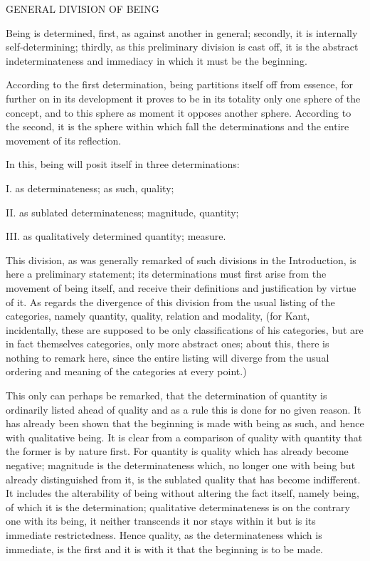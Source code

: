 GENERAL DIVISION OF BEING

Being is determined, first, as against another in general;
secondly, it is internally self-determining;
thirdly, as this preliminary division is cast off,
it is the abstract indeterminateness and immediacy
in which it must be the beginning.

According to the first determination,
being partitions itself off from essence,
for further on in its development it proves to be
in its totality only one sphere of the concept,
and to this sphere as moment it opposes another sphere.
According to the second, it is the sphere
within which fall the determinations
and the entire movement of its reflection.

In this, being will posit itself in three determinations:

I. as determinateness; as such, quality;

II. as sublated determinateness; magnitude, quantity;

III. as qualitatively determined quantity; measure.

This division, as was generally remarked of such divisions in the
Introduction, is here a preliminary statement;
its determinations must first arise from the movement of being itself,
and receive their definitions and justification by virtue of it.
As regards the divergence of this division from the usual listing
of the categories,  namely quantity, quality, relation and modality,
(for Kant, incidentally, these are supposed to be only classifications
of his categories, but are in fact themselves categories,
only more abstract ones; about this, there is nothing to remark here,
since the entire listing will diverge from the usual ordering and meaning
of the categories at every point.)

This only can perhaps be remarked, that the determination of quantity
is ordinarily listed ahead of quality and as a rule
this is done for no given reason.
It has already been shown that the beginning is made with being as such,
and hence with qualitative being.
It is clear from a comparison of quality with quantity that
the former is by nature first.
For quantity is quality which has already become negative;
magnitude is the determinateness which, no longer one with being but
already distinguished from it, is the sublated quality
that has become indifferent.
It includes the alterability of being without altering the fact itself,
namely being, of which it is the determination;
qualitative determinateness is on the contrary one with its being,
it neither transcends it nor stays within it
but is its immediate restrictedness.
Hence quality, as the determinateness which is immediate,
is the first and it is with it that the beginning is to be made.

